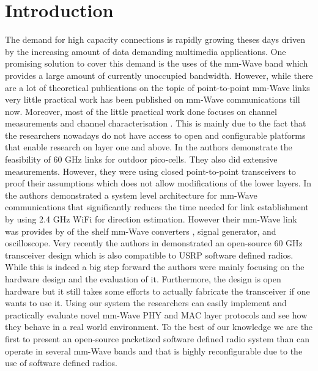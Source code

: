 \documentclass{acm_proc_article-sp}
\begin{document}



\section{Introduction}
The demand for high capacity connections is rapidly growing theses days driven by the increasing amount of data demanding multimedia applications. 
One promising solution to cover this demand is the uses of the mm-Wave band which provides a large amount of currently unoccupied bandwidth.
However, while there are a lot of theoretical publications on the topic of point-to-point mm-Wave links very little practical work has been published on mm-Wave communications till now.
Moreover, most of the little practical work done focuses on channel measurements and channel characterisation \cite{Rappaport01} \cite{Weiler14}.
This is mainly due to the fact that the researchers nowadays do not have access to open and configurable platforms that enable research on layer one and above. 
In \cite{Zhu14} the authors demonstrate the feasibility of 60 GHz links for outdoor pico-cells. They also did extensive measurements. However, they were using closed point-to-point transceivers \cite{hxi} to proof their assumptions which does not allow modifications of the lower layers.
In \cite{Nitsche15} the authors demonstrated a system level architecture for mm-Wave communications that significantly reduces the time needed for link establishment by using 2.4 GHz WiFi for direction estimation. However their mm-Wave link was provides by of the shelf mm-Wave converters \cite{vubiqnetworks}, signal generator, and oscilloscope.
Very recently the authors in \cite{Zetterberg15} demonstrated an open-source 60 GHz transceiver design which is also compatible to USRP software defined radios. While this is indeed a big step forward the authors were mainly focusing on the hardware design and the evaluation of it. Furthermore, the design is open hardware but it still takes some efforts to actually fabricate the transceiver if one wants to use it.
Using our system the researchers can easily implement and practically evaluate novel mm-Wave PHY and MAC layer protocols and see how they behave in a real world environment.
To the best of our knowledge we are the first to present an open-source packetized software defined radio system than can operate in several mm-Wave bands and that is highly reconfigurable due to the use of software defined radios.
\end{document}

